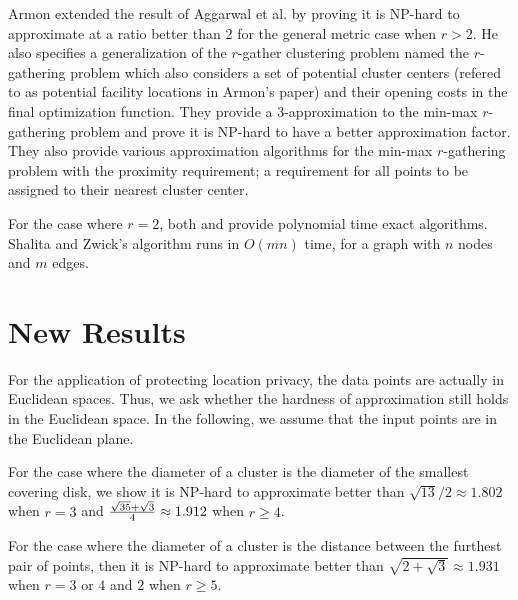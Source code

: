 \documentclass{acm_proc_article-sp}
\begin{document}
Armon \cite{armon2011min} extended the result of Aggarwal et al. by proving it is NP-hard to approximate at a ratio better than 2 for the general metric case when $r > 2$.  He also specifies a generalization of the $r$-gather clustering problem named the $r$-gathering problem which also considers a set of potential cluster centers (refered to as potential facility locations in Armon's paper) and their opening costs in the final optimization function. They provide a 3-approximation to the min-max $r$-gathering problem and prove it is NP-hard to have a better approximation factor.  They also provide various approximation algorithms for the min-max $r$-gathering problem with the proximity requirement; a requirement for all points to be assigned to their nearest cluster center.

For the case where $r = 2$, both \cite{anshelevich2011terminal} and \cite{shalita2010efficient} provide polynomial time exact algorithms.  Shalita and Zwick's \cite{shalita2010efficient} algorithm runs in $O(mn)$ time, for a graph with $n$ nodes and $m$ edges.


\section{New Results}

For the application of protecting location privacy, the data points are actually in Euclidean spaces. Thus, we ask whether the hardness of approximation still holds in the Euclidean space. In the following, we assume that the input points are in the Euclidean plane.  

For the case where the diameter of a cluster is the diameter of the smallest covering disk, we show it is NP-hard to approximate better than $\sqrt{13}/2 \approx 1.802$ when $r=3$ and ${\sqrt{35}+\sqrt{3} \over 4} \approx 1.912$ when $r \geq 4$.

For the case where the diameter of a cluster is the distance between the furthest pair of points, then it is NP-hard to approximate better than $\sqrt{2+\sqrt{3}} \approx 1.931$ when $r=3$ or $4$ and $2$ when $r\geq5$.

\end{document}
